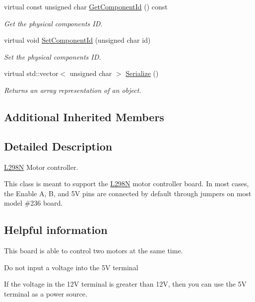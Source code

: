 \begin{DoxyCompactItemize}
virtual const unsigned char \hyperlink{classrbp_1_1L298N_af4c1a48847326d4f962594cacbcdfa9c}{Get\+Component\+Id} () const 
\begin{DoxyCompactList}\small\item\em Get the physical component\textquotesingle{}s I\+D. \end{DoxyCompactList}\item 
virtual void \hyperlink{classrbp_1_1L298N_ae2557785a6795a727c6526baade4c174}{Set\+Component\+Id} (unsigned char id)
\begin{DoxyCompactList}\small\item\em Set the physical component\textquotesingle{}s I\+D. \end{DoxyCompactList}\item 
virtual std\+::vector$<$ unsigned char $>$ \hyperlink{classrbp_1_1L298N_a9f05ae8fd5d1d15584f4afe4f59e0f1f}{Serialize} ()
\begin{DoxyCompactList}\small\item\em Returns an array representation of an object. \end{DoxyCompactList}\end{DoxyCompactItemize}
\subsection*{Additional Inherited Members}


\subsection{Detailed Description}
\hyperlink{classrbp_1_1L298N}{L298\+N} Motor controller. 

This class is meant to support the \hyperlink{classrbp_1_1L298N}{L298\+N} motor controller board. In most cases, the Enable A, B, and 5\+V pins are connected by default through jumpers on most model \#236 board.

\subsection*{Helpful information }


\begin{DoxyItemize}
\item This board is able to control two motors at the same time.
\item Do not input a voltage into the 5\+V terminal
\begin{DoxyItemize}
\item If the voltage in the 12\+V terminal is greater than 12\+V, then you can use the 5\+V terminal as a power source.
\end{DoxyItemize}
\end{DoxyItemize}

